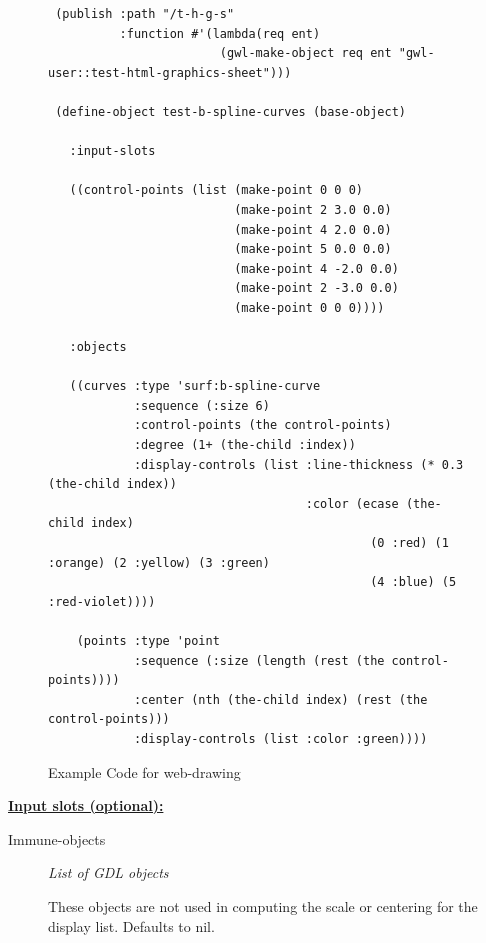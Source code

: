 \documentclass [11pt]{book}
\begin{document}
\begin{itemize}
\begin{figure}
\begin{lrbox}{\boxedverb}
\begin{minipage}{\linewidth}
{\begin{verbatim}
 (publish :path "/t-h-g-s"
          :function #'(lambda(req ent)
                        (gwl-make-object req ent "gwl-user::test-html-graphics-sheet")))

 (define-object test-b-spline-curves (base-object)

   :input-slots

   ((control-points (list (make-point 0 0 0)
                          (make-point 2 3.0 0.0) 
                          (make-point 4 2.0 0.0) 
                          (make-point 5 0.0 0.0) 
                          (make-point 4 -2.0 0.0) 
                          (make-point 2 -3.0 0.0) 
                          (make-point 0 0 0))))
  
   :objects

   ((curves :type 'surf:b-spline-curve
            :sequence (:size 6)
            :control-points (the control-points)
            :degree (1+ (the-child :index))
            :display-controls (list :line-thickness (* 0.3 (the-child index))
                                    :color (ecase (the-child index)
                                             (0 :red) (1 :orange) (2 :yellow) (3 :green)
                                             (4 :blue) (5 :red-violet))))

    (points :type 'point 
            :sequence (:size (length (rest (the control-points))))
            :center (nth (the-child index) (rest (the control-points)))
            :display-controls (list :color :green))))

\end{verbatim}}
\end{minipage}
\end{lrbox}
\fbox{\usebox{\boxedverb}}

\caption{Example Code for web-drawing}

\label{fig:example-code-web-drawing}

\end{figure}





\textbf{
\underline{Input slots (optional):}}

\begin{description}

\item [Immune-objects]
\emph{List of GDL objects}

 These objects are not used in computing the scale or centering for the display list. Defaults to nil.





\end{description}
\end{itemize}
\end{document}
